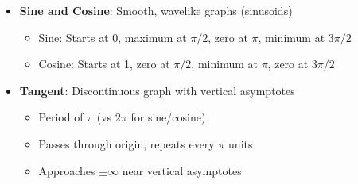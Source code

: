 \documentclass[../main-notes.tex]{subfile}
\begin{document}
\begin{itemize}
    \item \textbf{Sine and Cosine}: Smooth, wavelike graphs (sinusoids)
    \begin{itemize}
        \item Sine: Starts at 0, maximum at \(\pi/2\), zero at \(\pi\), minimum at \(3\pi/2\)
        \item Cosine: Starts at 1, zero at \(\pi/2\), minimum at \(\pi\), zero at \(3\pi/2\)
    \end{itemize}
    
    \item \textbf{Tangent}: Discontinuous graph with vertical asymptotes
    \begin{itemize}
        \item Period of \(\pi\) (vs \(2\pi\) for sine/cosine)
        \item Passes through origin, repeats every \(\pi\) units
        \item Approaches \(\pm\infty\) near vertical asymptotes
    \end{itemize}
\end{itemize}
\end{document}
